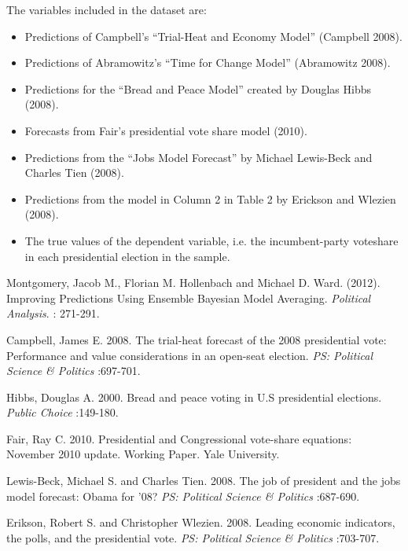 \documentclass[a4paper]{book}
\begin{document}
\begin{Details}\relax
The variables included in the dataset are:
\begin{itemize}

\item {} Predictions of Campbell's ``Trial-Heat and Economy Model'' (Campbell 2008).
\item {} Predictions of Abramowitz's ``Time for Change Model'' (Abramowitz 2008).
\item {} Predictions for the ``Bread and Peace Model'' created by Douglas Hibbs (2008).
\item {} Forecasts from Fair's presidential vote share model (2010).
\item {} Predictions from the ``Jobs Model Forecast''	by Michael Lewis-Beck and Charles Tien (2008).
\item {} Predictions from the model in Column 2 in Table 2 by Erickson and Wlezien (2008).
\item {} The true values of the dependent variable, i.e. the incumbent-party voteshare in each presidential election in the sample.

\end{itemize}

\end{Details}
%
\begin{References}\relax
Montgomery, Jacob M., Florian M. Hollenbach and Michael D. Ward. (2012). Improving Predictions Using Ensemble Bayesian Model Averaging.  \emph{Political Analysis}. : 271-291.

Campbell, James E. 2008. The trial-heat forecast of the 2008 presidential vote: Performance and value considerations in an open-seat election.  \emph{PS: Political Science \& Politics} :697-701.

Hibbs, Douglas A. 2000. Bread and peace voting in U.S presidential elections.  \emph{Public Choice} :149-180.

Fair, Ray C. 2010. Presidential and Congressional vote-share equations: November 2010 update. Working Paper. Yale University.

Lewis-Beck, Michael S. and Charles Tien. 2008. The job of president and the jobs model forecast: Obama for '08?  \emph{PS: Political Science \& Politics} :687-690.

Erikson, Robert S. and Christopher Wlezien. 2008. Leading economic indicators, the polls, and the presidential vote.  \emph{PS: Political Science \& Politics} :703-707.
\end{References}
\end{document}
